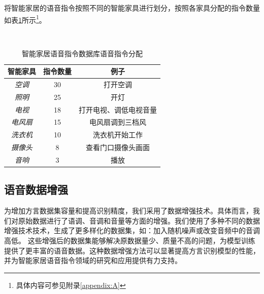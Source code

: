 \documentclass[lang=cn,cite=super]{elegantpaper}
\begin{document}
将智能家居的语音指令按照不同的智能家具进行划分，按照各家具分配的指令数量如表\ref{tab:1}所示\footnote{具体内容可参见附录\ref{appendix:A}}。
\begin{table}[h]
    \caption{\label{tab:1} 智能家居语音指令数据库语音指令分配}\
    \begin{center}
        \begin{tabular}{ccc}
            \toprule
            \textbf{智能家具} & \textbf{指令数量} & \textbf{例子} \\
            \midrule
            \textit{空调} & 30 & 打开空调 \\
            \textit{照明} & 25 & 开灯 \\
            \textit{电视} & 18 & 打开电视、调低电视音量 \\
            \textit{电风扇} & 15 & 电风扇调到三档风 \\
            \textit{洗衣机} & 10 & 洗衣机开始工作 \\
            \textit{摄像头} & 8 & 查看门口摄像头画面 \\
            \textit{音响} & 3 & 播放\\
            \bottomrule
        \end{tabular}
    \end{center}
\end{table}


\subsection{语音数据增强}
为增加方言数据集容量和提高识别精度，我们采用了数据增强技术。具体而言，我们对原始数据进行了语调、音调和音量等方面的增强。我们使用了多种不同的数据增强技术技术，生成了更多样化的数据集，如：加入随机噪声或改变音频中的音调高低。
这些增强后的数据集能够解决原数据量少、质量不高的问题，为模型训练提供了更丰富的语音数据。这种数据增强方法可以显著提高方言识别模型的性能，并为智能家居语音指令领域的研究和应用提供有力支持。
\end{document}
